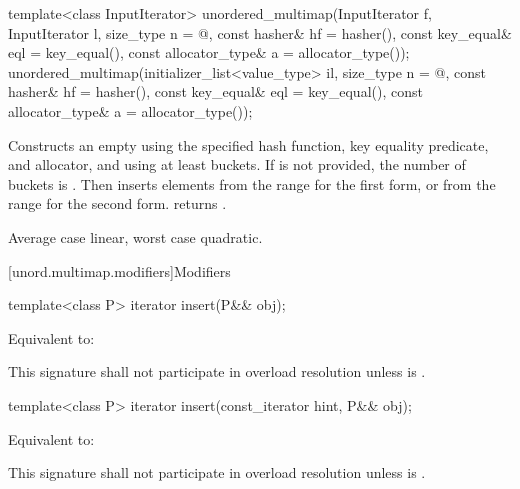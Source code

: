 %
\begin{itemdecl}
template<class InputIterator>
  unordered_multimap(InputIterator f, InputIterator l,
                     size_type n = @\seebelow@,
                     const hasher& hf = hasher(),
                     const key_equal& eql = key_equal(),
                     const allocator_type& a = allocator_type());
unordered_multimap(initializer_list<value_type> il,
                   size_type n = @\seebelow@,
                   const hasher& hf = hasher(),
                   const key_equal& eql = key_equal(),
                   const allocator_type& a = allocator_type());
\end{itemdecl}

\begin{itemdescr}
\pnum
\effects Constructs an empty  using the
specified hash function, key equality predicate, and allocator, and
using at least  buckets. If  is not
provided, the number of buckets is . Then
inserts elements from the range 
for the first form, or from the range
 for the second form.
 returns .

\pnum
\complexity Average case linear, worst case quadratic.
\end{itemdescr}

[unord.multimap.modifiers]{Modifiers}

%
\begin{itemdecl}
template<class P>
  iterator insert(P&& obj);
\end{itemdecl}

\begin{itemdescr}
\pnum
\effects Equivalent to: 

\pnum
\remarks This signature shall not participate in overload resolution
unless  is .
\end{itemdescr}

%
\begin{itemdecl}
template<class P>
  iterator insert(const_iterator hint, P&& obj);
\end{itemdecl}

\begin{itemdescr}
\pnum
\effects Equivalent to:

\pnum
\remarks This signature shall not participate in overload resolution
unless  is .
\end{itemdescr}

